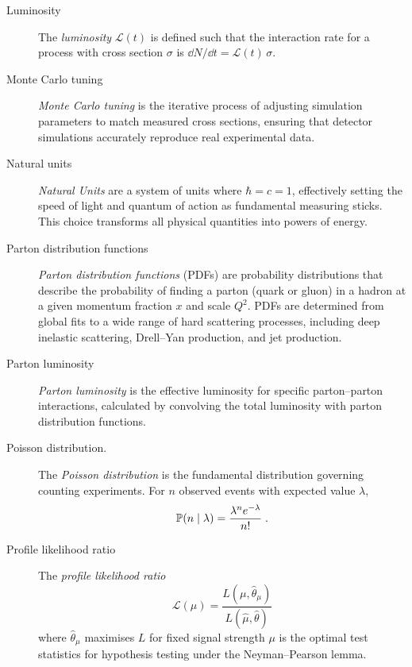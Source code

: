 \begin{description}
\item [Luminosity]
            The \emph{luminosity} \(\mathcal{L}(t)\) is defined such that the interaction rate for a process with cross section \(\sigma\) is \(\dd N/\dd t = \mathcal{L}(t)\,\sigma\).

\item [Monte Carlo tuning]
                \emph{Monte Carlo tuning} is the iterative process of adjusting simulation parameters to match measured cross sections, ensuring that detector simulations accurately reproduce real experimental data.

\item [Natural units]
        \emph{Natural Units} are a system of units where \(\hbar = c = 1\), effectively setting the speed of light and quantum of action as fundamental measuring sticks.
        This choice transforms all physical quantities into powers of energy.

\item [Parton distribution functions]
                \emph{Parton distribution functions} (PDFs) are probability distributions that describe the probability of finding a parton (quark or gluon) in a hadron at a given momentum fraction \(x\) and scale \(Q^2\).
                PDFs are determined from global fits to a wide range of hard scattering processes, including deep inelastic scattering, Drell--Yan production, and jet production.

\item [Parton luminosity]
                \emph{Parton luminosity} is the effective luminosity for specific parton--parton interactions, calculated by convolving the total luminosity with parton distribution functions.

\item [Poisson distribution.]
            The \emph{Poisson distribution} is the fundamental distribution governing counting experiments.
            For \(n\) observed events with expected value \(\lambda\),
            \[
                \P(n\mid\lambda) = \frac{\lambda^n e^{-\lambda}}{n!}\;.
            \]

\item [Profile likelihood ratio]
        The \emph{profile likelihood ratio}
            \[
                \mathcal L(\mu) = \frac{L(\mu, \hat\theta_\mu)}{ L(\hat\mu, \hat\theta)}
            \]
            where \(\hat\theta_\mu\) maximises \(L\) for fixed signal strength \(\mu\) is the optimal test statistics for hypothesis testing under the Neyman--Pearson lemma.


\end{description}

